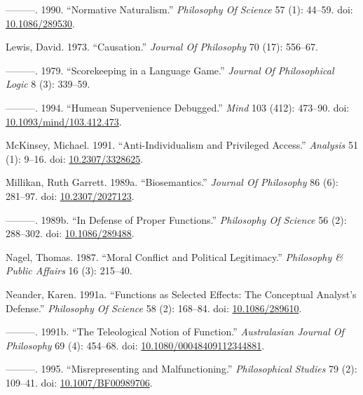 \documentclass[
  10pt,
  letterpaper,
  DIV=11,
  numbers=noendperiod,
  twoside]{scrartcl}
\newlength{\cslhangindent}
\newenvironment{CSLReferences}[2] %
 {\begin{list}{}{%
  \setlength{\itemindent}{0pt}
  \setlength{\leftmargin}{0pt}
  \setlength{\parsep}{0pt}
  \ifodd #1
   \setlength{\leftmargin}{\cslhangindent}
   \setlength{\itemindent}{-1\cslhangindent}
  \fi
  \setlength{\itemsep}{#2\baselineskip}}}
 {\end{list}}
\begin{document}
\begin{CSLReferences}{1}{0}
---------. 1990. {``Normative Naturalism.''} \emph{Philosophy Of
Science} 57 (1): 44--59. doi:
\href{https://doi.org/10.1086/289530}{10.1086/289530}.

Lewis, David. 1973. {``Causation.''} \emph{Journal Of Philosophy} 70
(17): 556--67.

---------. 1979. {``Scorekeeping in a Language Game.''} \emph{Journal Of
Philosophical Logic} 8 (3): 339--59.

---------. 1994. {``Humean Supervenience Debugged.''} \emph{Mind} 103
(412): 473--90. doi:
\href{https://doi.org/10.1093/mind/103.412.473}{10.1093/mind/103.412.473}.

McKinsey, Michael. 1991. {``Anti-Individualism and Privileged Access.''}
\emph{Analysis} 51 (1): 9--16. doi:
\href{https://doi.org/10.2307/3328625}{10.2307/3328625}.

Millikan, Ruth Garrett. 1989a. {``Biosemantics.''} \emph{Journal Of
Philosophy} 86 (6): 281--97. doi:
\href{https://doi.org/10.2307/2027123}{10.2307/2027123}.

---------. 1989b. {``In Defense of Proper Functions.''} \emph{Philosophy
Of Science} 56 (2): 288--302. doi:
\href{https://doi.org/10.1086/289488}{10.1086/289488}.

Nagel, Thomas. 1987. {``Moral Conflict and Political Legitimacy.''}
\emph{Philosophy \& Public Affairs} 16 (3): 215--40.

Neander, Karen. 1991a. {``Functions as Selected Effects: The Conceptual
Analyst's Defense.''} \emph{Philosophy Of Science} 58 (2): 168--84. doi:
\href{https://doi.org/10.1086/289610}{10.1086/289610}.

---------. 1991b. {``The Teleological Notion of Function.''}
\emph{Australasian Journal Of Philosophy} 69 (4): 454--68. doi:
\href{https://doi.org/10.1080/00048409112344881}{10.1080/00048409112344881}.

---------. 1995. {``Misrepresenting and Malfunctioning.''}
\emph{Philosophical Studies} 79 (2): 109--41. doi:
\href{https://doi.org/10.1007/BF00989706}{10.1007/BF00989706}.


\end{CSLReferences}
\end{document}
